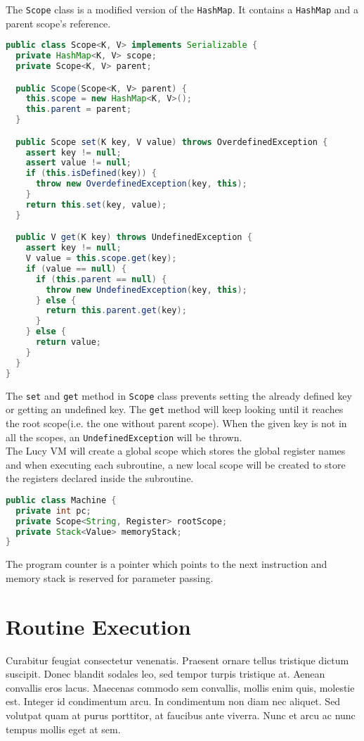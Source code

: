 The \texttt{Scope} class is a modified version of the \texttt{HashMap}. It contains a \texttt{HashMap} and a parent scope's reference.
\begin{lstlisting}[language=java]
public class Scope<K, V> implements Serializable {
  private HashMap<K, V> scope;
  private Scope<K, V> parent;

  public Scope(Scope<K, V> parent) {
    this.scope = new HashMap<K, V>();
    this.parent = parent;
  }

  public Scope set(K key, V value) throws OverdefinedException {
    assert key != null;
    assert value != null;
    if (this.isDefined(key)) {
      throw new OverdefinedException(key, this);
    }
    return this.set(key, value);
  }

  public V get(K key) throws UndefinedException {
    assert key != null;
    V value = this.scope.get(key);
    if (value == null) {
      if (this.parent == null) {
        throw new UndefinedException(key, this);
      } else {
        return this.parent.get(key);
      }
    } else {
      return value;
    }
  }
}
\end{lstlisting}
The \texttt{set} and \texttt{get} method in \texttt{Scope} class prevents setting the already defined key or getting an undefined key. The \texttt{get} method will keep looking until it reaches the root scope(i.e. the one without parent scope). When the given key is not in all the scopes, an \texttt{UndefinedException} will be thrown. \\
The Lucy VM will create a global scope which stores the global register names and when executing each subroutine, a new local scope will be created to store the registers declared inside the subroutine.
\begin{lstlisting}[language=java]
public class Machine {
  private int pc;
  private Scope<String, Register> rootScope;
  private Stack<Value> memoryStack;
}
\end{lstlisting}
The program counter is a pointer which points to the next instruction and memory stack is reserved for parameter passing.

\section{Routine Execution}
Curabitur feugiat consectetur venenatis. Praesent ornare tellus tristique dictum suscipit. Donec blandit sodales leo, sed tempor turpis tristique at. Aenean convallis eros lacus. Maecenas commodo sem convallis, mollis enim quis, molestie est. Integer id condimentum arcu. In condimentum non diam nec aliquet. Sed volutpat quam at purus porttitor, at faucibus ante viverra. Nunc et arcu ac nunc tempus mollis eget at sem.

